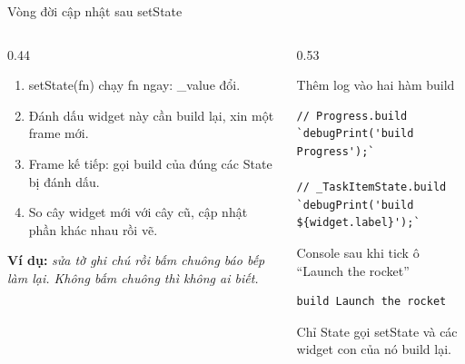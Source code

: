\documentclass[aspectratio=169,11pt]{beamer}
\newcommand{\ma}[1]{{\ttfamily\small #1}}
\newcommand{\chot}[1]{%
  \par\vspace{2.5mm}%
  \colorbox{nenhop}{\parbox{\dimexpr\linewidth-2\fboxsep\relax}{\raggedright\small\color{chinh}#1}}}
\newcommand{\vidu}[1]{%
  \par\vspace{2.5mm}%
  {\raggedright\small\color{xam}\textbf{Ví dụ:} \itshape #1\par}}
\newcommand{\nhanma}[1]{{\scriptsize\color{xam}#1\par}\vspace{0.8mm}}
\begin{document}
\begin{frame}[fragile]{Vòng đời cập nhật sau setState}
  \begin{columns}[T,onlytextwidth]
    \begin{column}{0.44\textwidth}
      \begin{enumerate}
        \item \ma{setState(fn)} chạy \ma{fn} ngay: \ma{\_value} đổi.
        \item Đánh dấu widget này cần build lại, xin một frame mới.
        \item Frame kế tiếp: gọi \ma{build} của đúng các State bị đánh dấu.
        \item So cây widget mới với cây cũ, cập nhật phần khác nhau rồi vẽ.
      \end{enumerate}
      \vidu{sửa tờ ghi chú rồi bấm chuông báo bếp làm lại. Không bấm chuông thì không ai biết.}
    \end{column}
    \begin{column}{0.53\textwidth}
      \nhanma{Thêm log vào hai hàm build}
\begin{lstlisting}
// Progress.build
`debugPrint('build Progress');`

// _TaskItemState.build
`debugPrint('build ${widget.label}');`
\end{lstlisting}
      \vspace{2mm}
      \nhanma{Console sau khi tick ô ``Launch the rocket''}
\begin{lstlisting}[style=log]
build Launch the rocket
\end{lstlisting}
      \chot{Chỉ State gọi \ma{setState} và các widget con của nó build lại.}
    \end{column}
  \end{columns}
\end{frame}
\end{document}
